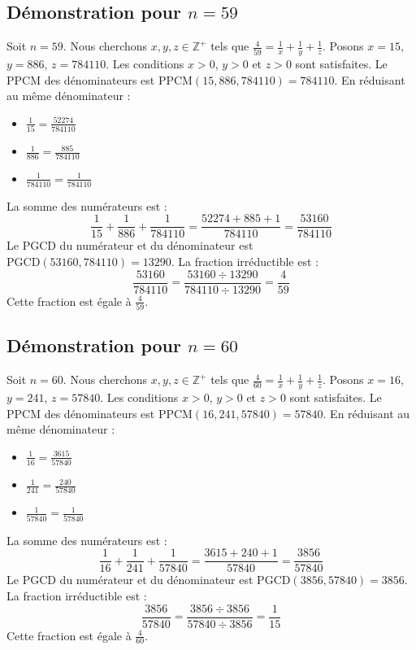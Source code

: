 \documentclass[11pt,a4paper]{article}
\begin{document}
\subsection{Démonstration pour $n = 59$}
Soit $n = 59$. Nous cherchons $x, y, z \in \mathbb{Z}^{+}$ tels que $\frac{4}{59} = \frac{1}{x} + \frac{1}{y} + \frac{1}{z}$.
Posons $x = 15$, $y = 886$, $z = 784110$.
Les conditions $x > 0$, $y > 0$ et $z > 0$ sont satisfaites.
Le PPCM des dénominateurs est $\text{PPCM}(15, 886, 784110) = 784110$.
En réduisant au même dénominateur :
\begin{itemize}
    \item $\frac{1}{15} = \frac{52274}{784110}$
    \item $\frac{1}{886} = \frac{885}{784110}$
    \item $\frac{1}{784110} = \frac{1}{784110}$
\end{itemize}
La somme des numérateurs est :
$$ \frac{1}{15} + \frac{1}{886} + \frac{1}{784110} = \frac{52274 + 885 + 1}{784110} = \frac{53160}{784110} $$
Le PGCD du numérateur et du dénominateur est $\text{PGCD}(53160, 784110) = 13290$.
La fraction irréductible est :
$$ \frac{53160}{784110} = \frac{53160 \div 13290}{784110 \div 13290} = \frac{4}{59} $$
Cette fraction est égale à $\frac{4}{59}$.

\subsection{Démonstration pour $n = 60$}
Soit $n = 60$. Nous cherchons $x, y, z \in \mathbb{Z}^{+}$ tels que $\frac{4}{60} = \frac{1}{x} + \frac{1}{y} + \frac{1}{z}$.
Posons $x = 16$, $y = 241$, $z = 57840$.
Les conditions $x > 0$, $y > 0$ et $z > 0$ sont satisfaites.
Le PPCM des dénominateurs est $\text{PPCM}(16, 241, 57840) = 57840$.
En réduisant au même dénominateur :
\begin{itemize}
    \item $\frac{1}{16} = \frac{3615}{57840}$
    \item $\frac{1}{241} = \frac{240}{57840}$
    \item $\frac{1}{57840} = \frac{1}{57840}$
\end{itemize}
La somme des numérateurs est :
$$ \frac{1}{16} + \frac{1}{241} + \frac{1}{57840} = \frac{3615 + 240 + 1}{57840} = \frac{3856}{57840} $$
Le PGCD du numérateur et du dénominateur est $\text{PGCD}(3856, 57840) = 3856$.
La fraction irréductible est :
$$ \frac{3856}{57840} = \frac{3856 \div 3856}{57840 \div 3856} = \frac{1}{15} $$
Cette fraction est égale à $\frac{4}{60}$.
\end{document}
